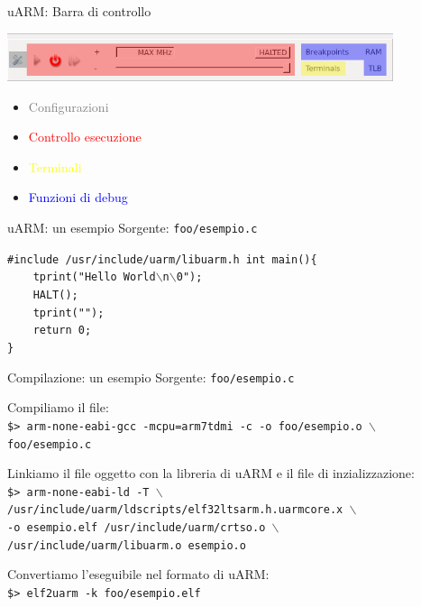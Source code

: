 \documentclass{beamer}
\begin{document}
\begin{frame}{uARM: Barra di controllo}

\begin{center}
\includegraphics[width=0.85\textwidth]{img/controllo_colori.png}
\end{center}

\vfill

{\footnotesize
\begin{itemize}\itemsep1pt
\item \textcolor{gray}{Configurazioni}
\item \textcolor{red}{Controllo esecuzione}
\item \textcolor{yellow}{Terminali}
\item \textcolor{blue}{Funzioni di debug}
\end{itemize}}
\end{frame}

\begin{frame}{uARM: un esempio}
Sorgente: \texttt{foo/esempio.c}

\vspace{20px}
\begin{framed}
\small\texttt{\#include /usr/include/uarm/libuarm.h\newline
\newline
int main()\{\\
~~~~tprint("Hello World$\backslash$n$\backslash$0");\\
~~~~HALT();\\
~~~~tprint("");\\
~~~~return 0;\\
\} }
\end{framed}
\end{frame}

\begin{frame}{Compilazione: un esempio}
Sorgente: \texttt{foo/esempio.c}

\vspace{15px}
Compiliamo il file:\\
{\small\texttt{\$> arm-none-eabi-gcc -mcpu=arm7tdmi -c -o foo/esempio.o $\backslash$
\\foo/esempio.c}}

\vspace{15px}
Linkiamo il file oggetto con la libreria di uARM e il file di inzializzazione:\\
{\small\texttt{\$> arm-none-eabi-ld -T $\backslash$\\
/usr/include/uarm/ldscripts/elf32ltsarm.h.uarmcore.x $\backslash$\\
-o esempio.elf /usr/include/uarm/crtso.o $\backslash$\\
/usr/include/uarm/libuarm.o esempio.o}}

\vspace{15px}
Convertiamo l'eseguibile nel formato di uARM:\\
{\small\texttt{\$> elf2uarm -k foo/esempio.elf}}

\end{frame}
\end{document}

